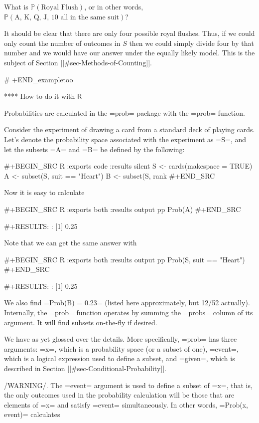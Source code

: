 What is \(\mathbb{P}(\mbox{Royal Flush})\), or in other words,
\(\mathbb{P}(\mbox{A, K, Q, J, 10 all in the same suit})\)?

It should be clear that there are only four possible royal
flushes. Thus, if we could only count the number of outcomes in \(S\)
then we could simply divide four by that number and we would have our
answer under the equally likely model. This is the subject of Section
[[#sec-Methods-of-Counting]].

# +END_exampletoo

**** How to do it with \(\mathsf{R}\)

Probabilities are calculated in the =prob= package \cite{prob} with
the =prob= function.

Consider the experiment of drawing a card from a standard deck of
playing cards. Let's denote the probability space associated with the
experiment as =S=, and let the subsets =A= and =B= be defined by the
following:

#+BEGIN_SRC R :exports code :results silent
S <- cards(makespace = TRUE) 
A <- subset(S, suit == "Heart") 
B <- subset(S, rank %
#+END_SRC 

Now it is easy to calculate 

#+BEGIN_SRC R :exports both :results output pp   
Prob(A) 
#+END_SRC 

#+RESULTS:
: [1] 0.25

Note that we can get the same answer with 

#+BEGIN_SRC R :exports both :results output pp   
Prob(S, suit == "Heart") 
#+END_SRC 

#+RESULTS:
: [1] 0.25

We also find =Prob(B) = 0.23= (listed here approximately, but
12/52 actually). Internally, the =prob= function operates by summing
the =probs= column of its argument. It will find subsets on-the-fly if
desired.

We have as yet glossed over the details. More specifically, =prob= has
three arguments: =x=, which is a probability space (or a subset of
one), =event=, which is a logical expression used to define a subset,
and =given=, which is described in Section [[#sec-Conditional-Probability]].

/WARNING/. The =event= argument is used to define a subset of =x=,
that is, the only outcomes used in the probability calculation will be
those that are elements of =x= and satisfy =event= simultaneously. In
other words, =Prob(x, event)= calculates

